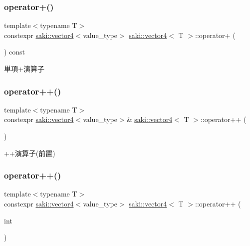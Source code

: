\subsubsection{\texorpdfstring{operator+()}{operator+()}}
{\footnotesize\ttfamily template$<$typename T$>$ \\
constexpr \mbox{\hyperlink{classsaki_1_1vector4}{saki\+::vector4}}$<$value\+\_\+type$>$ \mbox{\hyperlink{classsaki_1_1vector4}{saki\+::vector4}}$<$ T $>$\+::operator+ (\begin{DoxyParamCaption}{ }\end{DoxyParamCaption}) const\hspace{0.3cm}{\ttfamily [inline]}}



単項+演算子 

\mbox{\label{classsaki_1_1vector4_a8e271ede1ff3ffddcaa89a8b3e04fee7}} 
\subsubsection{\texorpdfstring{operator++()}{operator++()}\hspace{0.1cm}{\footnotesize\ttfamily [1/2]}}
{\footnotesize\ttfamily template$<$typename T$>$ \\
constexpr \mbox{\hyperlink{classsaki_1_1vector4}{saki\+::vector4}}$<$value\+\_\+type$>$\& \mbox{\hyperlink{classsaki_1_1vector4}{saki\+::vector4}}$<$ T $>$\+::operator++ (\begin{DoxyParamCaption}{ }\end{DoxyParamCaption})\hspace{0.3cm}{\ttfamily [inline]}}



++演算子(前置) 

\mbox{\label{classsaki_1_1vector4_ab0ac68c756d4435af9255a9635dc33ed}} 
\subsubsection{\texorpdfstring{operator++()}{operator++()}\hspace{0.1cm}{\footnotesize\ttfamily [2/2]}}
{\footnotesize\ttfamily template$<$typename T$>$ \\
constexpr \mbox{\hyperlink{classsaki_1_1vector4}{saki\+::vector4}}$<$value\+\_\+type$>$ \mbox{\hyperlink{classsaki_1_1vector4}{saki\+::vector4}}$<$ T $>$\+::operator++ (\begin{DoxyParamCaption}\item[{int}]{ }\end{DoxyParamCaption})\hspace{0.3cm}{\ttfamily [inline]}}



